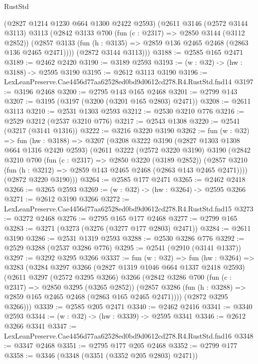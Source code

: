 \begin{lexlean}{RustStd}
\begin{coremodule}
      (@2827 @1214 @1230 @664 @1300 @2422 @2593)
      (@2611
        @3146
        (@2572 @3144 @3113)
        @3113
        (@2842
          @3133
          @700
          (fun (c : @2317) => @2850 @3144 (@3112 @2852))
          (@2857 @3133 (fun (h : @3135) => @2859 @136 @2465 @2468 (@2863 @136 @2465 @2471))))
        (@2872 @3144 @3113)))
@3188 := @2585 @165 @2471
@3189 := @2462 @2420
@3190 := @3189 @2593
@3193 := (w : @32) -> (hw : @3188) -> @2595 @3190
@3195 := @2612 @3113 @3190
@3196 := LexLeanPreserve.Cae4456d77aa62528ed0bd9d0612cd278.R4.RustStd.fnd14
@3197 := @3196 @2468
@3200 := @2795 @143 @165 @2468
@3201 := @2799 @143
@3207 := @3195 (@3197 (@3200 (@3201 @165 @2803) @2471))
@3208 := @2611 @3113
@3210 := @2531 @1303 @2593
@3212 := @2530 @3210 @776
@3216 := @2529 @3212 (@2537 @3210 @776)
@3217 := @2543 @1308
@3220 := @2541 (@3217 (@3141 @1316))
@3222 := @3216 @3220 @3190
@3262 := fun (w : @32) =>
  fun (hw : @3188) =>
  @3207
    (@3208
      @3222
      @3190
      (@2827 @1303 @1308 @664 @1316 @2420 @2593)
      (@2611
        @3222
        (@2572 @3220 @3190)
        @3190
        (@2842
          @3210
          @700
          (fun (c : @2317) => @2850 @3220 (@3189 @2852))
          (@2857 @3210 (fun (h : @3212) => @2859 @143 @2465 @2468 (@2863 @143 @2465 @2471))))
        (@2872 @3220 @3190)))
@3264 := @2585 @177 @2471
@3265 := @2462 @2418
@3266 := @3265 @2593
@3269 := (w : @32) -> (hw : @3264) -> @2595 @3266
@3271 := @2612 @3190 @3266
@3272 := LexLeanPreserve.Cae4456d77aa62528ed0bd9d0612cd278.R4.RustStd.fnd15
@3273 := @3272 @2468
@3276 := @2795 @165 @177 @2468
@3277 := @2799 @165
@3283 := @3271 (@3273 (@3276 (@3277 @177 @2803) @2471))
@3284 := @2611 @3190
@3286 := @2531 @1319 @2593
@3288 := @2530 @3286 @776
@3292 := @2529 @3288 (@2537 @3286 @776)
@3295 := @2541 (@2910 (@3141 @1337))
@3297 := @3292 @3295 @3266
@3337 := fun (w : @32) =>
  fun (hw : @3264) =>
  @3283
    (@3284
      @3297
      @3266
      (@2827 @1319 @1046 @664 @1337 @2418 @2593)
      (@2611
        @3297
        (@2572 @3295 @3266)
        @3266
        (@2842
          @3286
          @700
          (fun (c : @2317) => @2850 @3295 (@3265 @2852))
          (@2857 @3286 (fun (h : @3288) => @2859 @165 @2465 @2468 (@2863 @165 @2465 @2471))))
        (@2872 @3295 @3266)))
@3339 := @2585 @205 @2471
@3340 := @2462 @2416
@3341 := @3340 @2593
@3344 := (w : @32) -> (hw : @3339) -> @2595 @3341
@3346 := @2612 @3266 @3341
@3347 := LexLeanPreserve.Cae4456d77aa62528ed0bd9d0612cd278.R4.RustStd.fnd16
@3348 := @3347 @2468
@3351 := @2795 @177 @205 @2468
@3352 := @2799 @177
@3358 := @3346 (@3348 (@3351 (@3352 @205 @2803) @2471))

\end{coremodule}
\end{lexlean}

